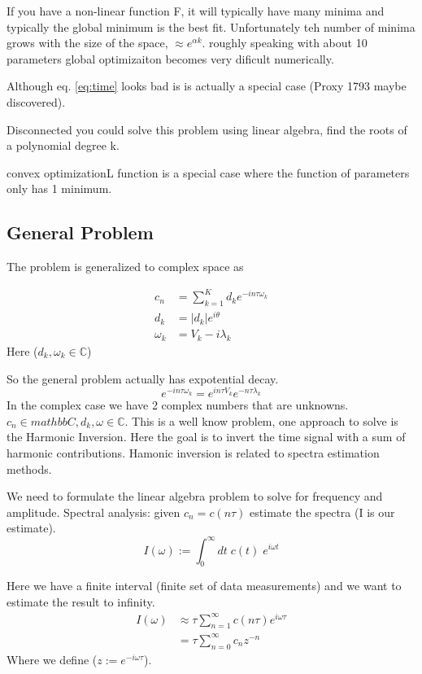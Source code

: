 \documentclass{article}
\newcommand{\be}{\begin{equation}}
\newcommand{\ee}{\end{equation}}
\begin{document}
If you have a non-linear function F, it will typically have many minima and typically the global minimum is the best fit.
Unfortunately teh number of minima grows with the size of the space, $\approx e^{\alpha k}$.
roughly speaking with about 10 parameters global optimizaiton becomes very dificult numerically.

Although eq. \ref{eq:time} looks bad is is actually a special case (Proxy 1793 maybe discovered).

Disconnected you could solve this problem using linear algebra, find the roots of a polynomial degree k.

convex optimizationL function is a special case where the function of parameters only has 1 minimum.

\subsection{General Problem}
The problem is generalized to complex space as

\be
\begin{split}
    c_n &= \sum_{k=1}^K d_k e^{-in\tau \omega_k}\\
    d_k &= |d_k|e^{i\theta}\\
    \omega_k &= V_k - i\lambda_k
\end{split}
\ee
Here ($d_k,\omega_k \in \mathbb{C}$)

So the general problem actually has expotential decay.
\be
e^{-in\tau \omega_k} = e^{in\tau V_k}e^{-n\tau \lambda_k}
\ee
In the complex case we have 2 complex numbers that are unknowns.
$c_n \in mathbb{C}, d_k, \omega \in \mathbb{C}$.
This is a well know problem, one approach to solve is the Harmonic Inversion.
Here the goal is to invert the time signal with a sum of harmonic contributions.
Hamonic inversion is related to spectra estimation methods.

We need to formulate the linear algebra problem to solve for frequency and amplitude.
Spectral analysis: given $c_n = c(n\tau)$ estimate the spectra (I is our estimate).
\be
I(\omega) := \int_0^\infty dt\; c(t)\; e^{i\omega t}
\ee

Here we have a finite interval (finite set of data measurements) and we want to estimate the result to infinity.
\be
\begin{split}
    I(\omega) &\approx \tau \sum_{n=1}^\infty c(n\tau)e^{i\omega\tau}\\
    &= \tau \sum_{n=0}^\infty c_n z^{-n}
\end{split}
\ee
Where we define ($z:=e^{-i\omega\tau}$).
\end{document}
